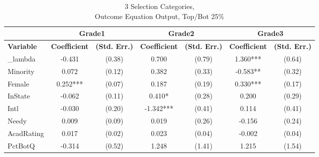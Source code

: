 \begin{sidewaystable}[htb]\centering
  \begin{threeparttable}
    \caption{3 Selection Categories, \\Outcome Equation Output, Top/Bot 25\%}\label{table:b5}
    \begin{tabular}{l|c|c|c|c|c|c}
      \hline\hline 
                        & \multicolumn{2}{|c|}{Grade1} & \multicolumn{2}{|c|}{Grade2} & \multicolumn{2}{|c}{Grade3}                                                               \\
      \hline
      \textbf{Variable} & \textbf{Coefficient}         & \textbf{(Std. Err.)}         & \textbf{Coefficient} & \textbf{(Std. Err.)} & \textbf{Coefficient} & \textbf{(Std. Err.)} \\ 
      \hline
      \hline 
      \_lambda          & -0.431                       & (0.38)                       & 0.700                & (0.79)               & 1.360***             & (0.64)               \\
      Minority          & 0.072                        & (0.12)                       & 0.382                & (0.33)               & -0.583**             & (0.32)               \\
      Female            & 0.252***                     & (0.07)                       & 0.187                & (0.19)               & 0.330***             & (0.17)               \\
      InState           & -0.062                       & (0.11)                       & 0.410*               & (0.28)               & 0.200                & (0.29)               \\
      Intl              & -0.030                       & (0.20)                       & -1.342***            & (0.41)               & 0.114                & (0.41)               \\
      Needy             & 0.009                        & (0.09)                       & 0.019                & (0.26)               & -0.156               & (0.24)               \\
      AcadRating        & 0.017                        & (0.02)                       & 0.023                & (0.04)               & -0.002               & (0.04)               \\
      PctBotQ           & -0.314                       & (0.52)                       & 1.248                & (1.41)               & 1.215                & (1.54)               \\

\end{tabular}
\end{threeparttable}
\end{sidewaystable}
